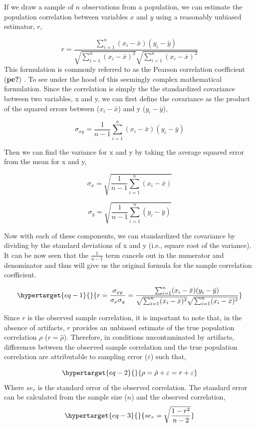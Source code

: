 \documentclass[
  letterpaper,
  DIV=11,
  numbers=noendperiod]{scrreprt}
\begin{document}
If we draw a sample of \(n\) observations from a population, we can
estimate the population correlation between variables \(x\) and \(y\)
using a reasonably unbiased estimator, \(r\),

\[
r = \frac{
\sum_{i=1}^{n}(x_i - \bar{x})(y_i - \bar{y})
}{
\sqrt{\sum_{i=1}^{n}(x_i - \bar{x})^2}
\sqrt{\sum_{i=1}^{n}(x_i - \bar{x})^2}
}
\]This formulation is commonly referred to as the Pearson correlation
coefficient (\textbf{pe?}) . To see under the hood of this seemingly
complex mathematical formulation. Since the correlation is simply the
the standardized covariance between two variables, x and y, we can first
define the covariance as the product of the squared errors between
(\(x_i - \bar{x}\)) and y (\(y_i - \bar{y}\)),

\[
\sigma_{xy} =\frac{1}{n-1}\sum_{i=1}^{n}(x_i - \bar{x})(y_i - \bar{y})
\]

Then we can find the variance for x and y by taking the average squared
error from the mean for x and y,

\[
\sigma_x = \sqrt{\frac{1}{n-1}\sum_{i=1}^n (x_i - \bar{x})}
\]

\[
\sigma_y = \sqrt{\frac{1}{n-1}\sum_{i=1}^n (y_i - \bar{y})}
\]

Now with each of these components, we can standardized the covariance by
dividing by the standard deviations of x and y (i.e., square root of the
variance). It can be now seen that the \(\frac{1}{n-1}\) term cancels
out in the numerator and denominator and thus will give us the original
formula for the sample correlation coefficient.

\begin{equation}\protect\hypertarget{eq-1}{}{
r = \frac{\sigma_{xy}}{\sigma_x\sigma_y} = \frac{\sum_{i=1}^{n}(x_i - \bar{x})(y_i - \bar{y})}{\sqrt{\sum_{i=1}^{n}(x_i - \bar{x})^2}\sqrt{\sum_{i=1}^{n}(x_i - \bar{x})^2}}
}\label{eq-1}\end{equation}

Since \(r\) is the observed sample correlation, it is important to note
that, in the absence of artifacts, \(r\) provides an unbiased estimate
of the true population correlation \(\rho\) (\(r =\hat{\rho}\)).
Therefore, in conditions uncontaminated by artifacts, differences
between the observed sample correlation and the true population
correlation are attributable to sampling error (\(\varepsilon\)) such
that,

\begin{equation}\protect\hypertarget{eq-2}{}{
\rho = \hat{\rho} + \varepsilon = r + \varepsilon
}\label{eq-2}\end{equation} Where \(se_r\) is the standard error of the
observed correlation. The standard error can be calculated from the
sample size (\(n\)) and the observed correlation,
\begin{equation}\protect\hypertarget{eq-3}{}{
se_r =\sqrt{\frac{1 - r^2}{n-2}} 
}\label{eq-3}\end{equation}
\end{document}
